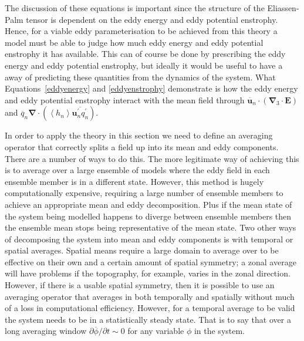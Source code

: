 \documentclass[12pt,a4paper]{report}
\newcommand*\mean[1]{\overline{#1}}
\newcommand*\thkmean[1]{\overline{#1}}
\newcommand*\thkres[1]{{#1}^{\prime}}
\newcommand*\nthkmean[1]{\left\langle{#1}\right\rangle}
\begin{document}
              The discussion of these equations is important since
              the structure of the Eliassen-Palm tensor is 
              dependent on the eddy energy and eddy potential enstrophy. 
              Hence, for a viable eddy parameterisation to be achieved
              from this theory a model must be able to 
              judge how much eddy energy and eddy potential enstrophy it has
              available. This can of course be done by prescribing the
               eddy energy and eddy potential enstrophy, but ideally 
               it would be useful to have a away of predicting these
               quantities from the dynamics of the system. What Equations~\eqref{eddyenergy}
               and \eqref{eddyenstrophy} demonstrate is how the eddy energy 
               and eddy potential enstrophy interact with the mean field through
               $\thkmean{\boldsymbol{u}}_{n} \cdot \left(\boldsymbol{\nabla}_{3}\cdot \boldsymbol{E}\right)$ and $\thkmean{q}_{n} \boldsymbol{\nabla}\cdot\left( \nthkmean{h_{n}} \thkmean{\thkres{\boldsymbol{u}}_{n}\thkres{q}_{n}} \right)$.
              
              
              In order to apply the theory in this section we need to define an
              averaging operator that correctly splits a field up into its mean
              and eddy components. There are a number of ways to do this. 
              The more legitimate way of achieving this is
              to average over a large ensemble of models where the eddy field in each
              ensemble member is in a different state. However, this method is 
              hugely computationally expensive, requiring a large number of 
              ensemble members to achieve an appropriate mean and eddy
              decomposition. Plus if the mean state of the system being modelled happens 
              to diverge between ensemble members then the ensemble mean stops being 
              representative of the mean state. Two other ways of decomposing
              the system into mean and eddy components is with temporal or spatial
              averages. Spatial means require a large domain to average over to be effective
              on their own and a certain amount of spatial symmetry; a 
              zonal average will have problems if the topography, for example,
              varies in the zonal direction. However, if there is
              a usable spatial symmetry, then it is possible to use
              an averaging operator that averages in both temporally and spatially
              without much of a loss in computational efficiency. However,
              for a temporal average to be valid the system needs to be in
              a statistically steady state. That is to say that over a long
              averaging window $\partial \mean{\phi} /\partial t \sim 0$ for any variable $\phi$
            in the system.
            
\end{document}
